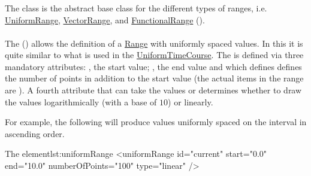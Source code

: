 

\subsubsection{}
\label{class:range}
The  class is the abstract base class for the different types of ranges, i.e. \hyperref[class:uniformRange]{UniformRange}, \hyperref[class:vectorRange]{VectorRange}, and \hyperref[class:functionalRange]{FunctionalRange} (). 


\paragraph{}
\label{class:uniformRange}
The  () allows the definition of a \hyperref[class:range]{Range} with uniformly spaced values. In this it is quite similar to what is used in the \hyperref[class:uniformTimeCourse]{UniformTimeCourse}. The  is defined via three mandatory attributes: , the start value; , the end value and  which defines defines the number of points in addition to the start value (the actual items in the range are ). A fourth attribute  that can take the values  or  determines whether to draw the values logarithmically (with a base of $10$) or linearly.

For example, the following  will produce  values uniformly spaced on the interval \code{$[0, 10]$} in ascending order.
\begin{myXmlLst}{The  element}{lst:uniformRange}
<uniformRange id="current" start="0.0" end="10.0" numberOfPoints="100" type="linear" /> 
\end{myXmlLst}

